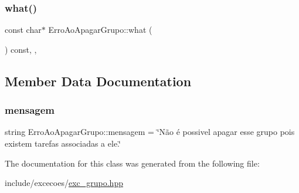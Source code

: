 \subsubsection{\texorpdfstring{what()}{what()}}
{\footnotesize\ttfamily const char$\ast$ Erro\+Ao\+Apagar\+Grupo\+::what (\begin{DoxyParamCaption}{ }\end{DoxyParamCaption}) const\hspace{0.3cm}{\ttfamily [inline]}, {\ttfamily [override]}, {\ttfamily [noexcept]}}



\subsection{Member Data Documentation}
\mbox{\label{classErroAoApagarGrupo_a9a71b44cefcc19a8f9d4b8f97efa9ac5}} 
\subsubsection{\texorpdfstring{mensagem}{mensagem}}
{\footnotesize\ttfamily string Erro\+Ao\+Apagar\+Grupo\+::mensagem = \char`\"{}Não é possivel apagar esse grupo pois existem tarefas associadas a ele.\char`\"{}\hspace{0.3cm}{\ttfamily [private]}}



The documentation for this class was generated from the following file\+:\begin{DoxyCompactItemize}
\item 
include/excecoes/\hyperlink{exc__grupo_8hpp}{exc\+\_\+grupo.\+hpp}\end{DoxyCompactItemize}

